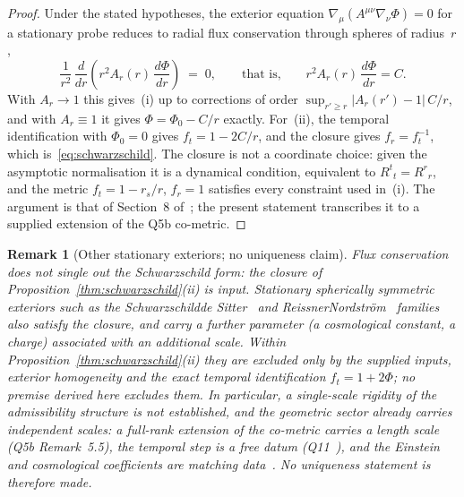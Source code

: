 \documentclass[11pt,a4paper]{article}
\newtheorem{remark}[theorem]{Remark}
\begin{document}
  \begin{proof}
    Under the stated hypotheses, the exterior equation $\nabla_\mu(A^{\mu\nu}\nabla_\nu\Phi) = 0$ for a stationary
    probe reduces to radial flux conservation through spheres of radius~$r$,
    \begin{equation}
      \label{eq:flux-conservation}
      \frac{1}{r^2}\,\frac{d}{dr}\!\left(r^2 A_r(r)\,\frac{d\Phi}{dr}\right) \;=\; 0,
      \qquad\text{that is,}\qquad r^2 A_r(r)\,\frac{d\Phi}{dr} = C.
    \end{equation}
    With $A_r \to 1$ this gives~(i) up to corrections of order $\sup_{r' \ge r}\lvert A_r(r') - 1\rvert\, C/r$, and
    with $A_r \equiv 1$ it gives $\Phi = \Phi_0 - C/r$ exactly.
    For~(ii), the temporal identification with $\Phi_0 = 0$ gives $f_t = 1 - 2C/r$, and the closure gives
    $f_r = f_t^{-1}$, which is~\eqref{eq:schwarzschild}.
    The closure is not a coordinate choice: given the asymptotic normalisation it is a dynamical condition, equivalent
    to $R^t{}_t = R^r{}_r$, and the metric $f_t = 1 - r_s/r$, $f_r = 1$ satisfies every constraint used in~(i).
    The argument is that of Section~8 of~\cite{Beau2026c}; the present statement transcribes it to a supplied
    extension of the Q5b co-metric.
  \end{proof}

  \begin{remark}[Other stationary exteriors; no uniqueness claim]
    \label{rem:schwarzschild-uniqueness}
    Flux conservation does not single out the Schwarzschild form: the closure of
    Proposition~\ref{thm:schwarzschild}(ii) is input.
    Stationary spherically symmetric exteriors such as the Schwarzschild\textendash de Sitter~\cite{Kottler1918} and
    Reissner\textendash Nordstr\"om~\cite{Reissner1916,Nordstrom1918} families also satisfy the closure, and carry a
    further parameter (a cosmological constant, a charge) associated with an additional scale.
    Within Proposition~\ref{thm:schwarzschild}(ii) they are excluded only by the supplied inputs, exterior homogeneity
    and the exact temporal identification $f_t = 1 + 2\Phi$; no premise derived here excludes them.
    In particular, a single-scale rigidity of the admissibility structure is not established, and the geometric
    sector already carries independent scales: a full-rank extension of the co-metric carries a length scale
    (Q5b Remark~5.5), the temporal step is a free datum (Q11~\cite{Beau2026q11}), and the Einstein and cosmological
    coefficients are matching data~\cite{Beau2026h,Beau2026Thermodynamics}.
    No uniqueness statement is therefore made.
  \end{remark}
\end{document}
